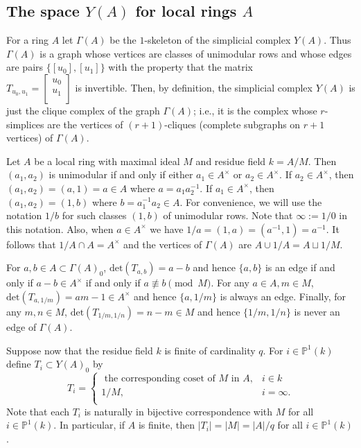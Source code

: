 \documentclass[12pt]{amsart}
\theoremstyle{definition}
\newcommand{\pn}[2]{\mathbb{P}^{#1}(#2)}
\newcommand{\projl}[1]{\pn{1}{#1}}
\newcommand{\<}{\langle}
\renewcommand{\>}{\rangle}
\begin{document}
\subsection{ The space $Y(A)$ for local rings $A$}
For a ring $A$ let $\Gamma(A)$ be the $1$-skeleton of the simplicial complex $Y(A)$. Thus $\Gamma(A)$ is a graph whose vertices are classes of unimodular rows and whose edges are pairs 
$\{ [u_0], [u_1]\}$ with the property that the matrix\\
 $T_{u_0,u_1}=\left[
\begin{array}{c}
u_0\\
u_1\\
\end{array}
\right]$ is invertible. Then, by definition, the simplicial complex $Y(A)$ is just the clique complex of the graph $\Gamma(A)$; i.e., it is the complex whose $r$-simplices are the vertices of $(r+1)$-cliques (complete subgraphs on $r+1$ vertices)  of $\Gamma(A)$.  




Let $A$ be a local ring with maximal ideal ${M}$ and residue field $k=A/M$. Then $(a_1,a_2)$ is unimodular if and only if either $a_1\in A^\times$ or $a_2\in A^\times$. If $a_2\in A^\times$, 
then $(a_1,a_2)=(a,1)=a\in A$ where $a=a_1a_2^{-1}$. If $a_1\in A^\times$, then $(a_1,a_2)=(1,b)$ where $b=a_1^{-1}a_2\in A$. For convenience, we will use the notation $1/b$ for such classes $(1,b)$ of unimodular rows.  Note that $\infty:=1/0$ in this notation. Also,  when $a\in A^\times$ we have $1/a=(1,a)=(a^{-1},1)=a^{-1}$. It follows that $1/A\cap A=A^\times$ and the vertices of $\Gamma(A)$ 
are $A\cup 1/A=A\sqcup 1/M$. 

For $a,b\in A\subset \Gamma(A)_0$, $\mathrm{det}(T_{a,b})=a-b$ and hence $\{ a,b\}$ is an edge if and only if $a-b\in A^\times$ if and only if $a\not\equiv b\pmod{M}$.
For any $a\in A, m\in M$, $\mathrm{det}(T_{a,1/m})=am-1\in A^\times$ and hence $\{ a,1/m\}$ is always an edge. Finally, for 
any $m,n\in M$, $\mathrm{det}(T_{1/m,1/n})=n-m\in M$ and hence $\{ 1/m,1/n\}$ is never an edge of $\Gamma(A)$.

Suppose now that the residue field $k$ is finite of cardinality $q$.
For $i\in \projl{k}$ define $T_i\subset Y(A)_0$ by
\[
T_i=\left\{
\begin{array}{ll}
\mbox{ the corresponding coset of $M$ in $A$},& i\in k\\
1/M,& i=\infty.\\
\end{array}
\right.
\]  
Note that each $T_i$ is naturally in bijective correspondence with $M$ for all $i\in\projl{k}$. In particular, if $A$ is finite, then $|T_i|=|M|=|A|/q$ for all $i\in\projl{k}$.
\end{document}
